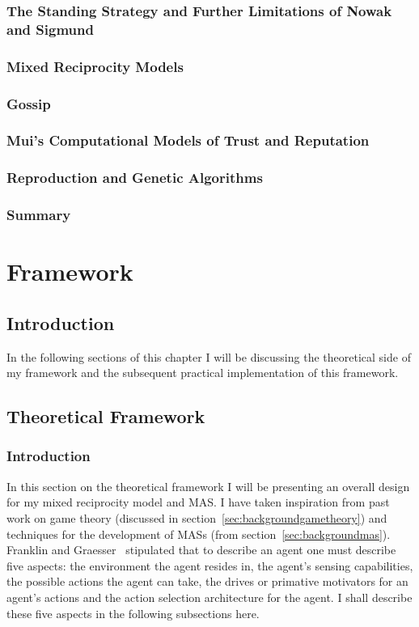 \documentclass[]{final_report}
\begin{document}
\subsection{The Standing Strategy and Further Limitations of Nowak and Sigmund}

\subsection{Mixed Reciprocity Models}

\subsection{Gossip}

\subsection{Mui's Computational Models of Trust and Reputation}

\subsection{Reproduction and Genetic Algorithms}
\label{subs:backgroundreproduction}

\subsection{Summary}

\chapter{Framework}

\section{Introduction}
In the following sections of this chapter I will be discussing the theoretical side of my framework and the subsequent practical implementation of this framework.

\section{Theoretical Framework}

\subsection{Introduction}
In this section on the theoretical framework I will be presenting an overall design for my mixed reciprocity model and MAS. I have taken inspiration from past work on game theory (discussed in section~\ref{sec:backgroundgametheory}) and techniques for the development of MASs (from section~\ref{sec:backgroundmas}). Franklin and Graesser~\cite{franklin1996agent} stipulated that to describe an agent one must describe five aspects: the environment the agent resides in, the agent's sensing capabilities, the possible actions the agent can take, the drives or primative motivators for an agent's actions and the action selection architecture for the agent. I shall describe these five aspects in the following subsections here.
\end{document}
